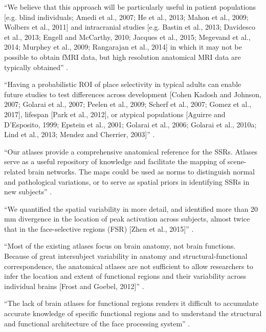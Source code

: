 ``We believe that this approach will be particularly useful in patient
populations [e.g. blind individuals; Amedi et al., 2007; He et al., 2013; Mahon
et al., 2009; Wolbers et al., 2011] and intracranial studies [e.g. Bastin et
al., 2013; Davidesco et al., 2013; Engell and McCarthy, 2010; Jacques et al.,
2015; Megevand et al., 2014; Murphey et al., 2009; Rangarajan et al., 2014] in
which it may not be possible to obtain fMRI data, but high resolution anatomical
MRI data are typically obtained'' \citep{weiner2018defining}.

``Having a probabilistic ROI of place selectivity in typical adults can enable
future studies to test differences across development [Cohen Kadosh and Johnson,
2007; Golarai et al., 2007; Peelen et al., 2009; Scherf et al., 2007; Gomez et
al., 2017], lifespan [Park et al., 2012], or atypical populations [Aguirre and
D'Esposito, 1999; Epstein et al., 2001; Golarai et al., 2006; Golarai et al.,
2010a; Lind et al., 2013; Mendez and Cherrier, 2003]''
\citep{weiner2018defining}.


``Our atlases provide a comprehensive anatomical reference for the SSRs.
%
Atlases serve as a useful repository of knowledge and facilitate the mapping of
scene-related brain networks.
%
The maps could be used as norms to distinguish normal and pathological
variations, or to serve as spatial priors in identifying SSRs in new subjects''
\citep{zhen2017quantifying}.

``We quantified the spatial variability in more detail, and identified more than
20 mm divergence in the location of peak activation across subjects, almost
twice that in the face-selective regions (FSR) [Zhen et al., 2015]''
\citep{zhen2017quantifying}.






``Most of the existing atlases focus on brain anatomy, not brain functions.
%
Because of great intersubject variability in anatomy and structural-functional
correspondence, the anatomical atlases are not sufficient to allow researchers
to infer the location and extent of functional regions and their variability
across individual brains [Frost and Goebel, 2012]'' \citep{zhen2015quantifying}.

``The lack of brain atlases for functional regions renders it difficult to
accumulate accurate knowledge of specific functional regions and to understand
the structural and functional architecture of the face processing system''
\citep{zhen2015quantifying}.

